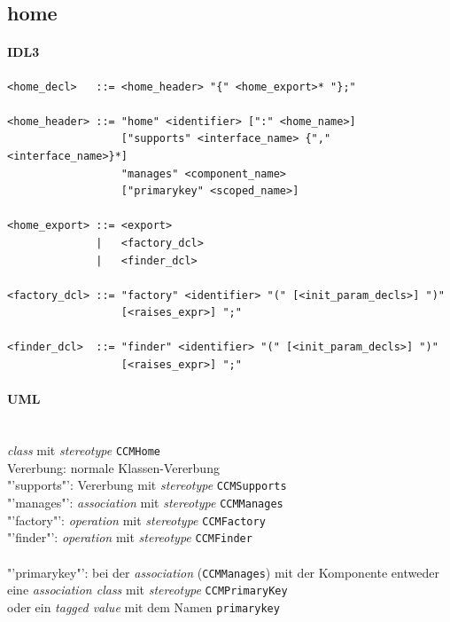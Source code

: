 \documentclass [a4paper,10pt] {scrartcl}
\begin{document}
\cleardoublepage
\subsection{home}
\paragraph{IDL3}
\begin{verbatim}
<home_decl>   ::= <home_header> "{" <home_export>* "};"

<home_header> ::= "home" <identifier> [":" <home_name>]
                  ["supports" <interface_name> {"," <interface_name>}*]
                  "manages" <component_name>
                  ["primarykey" <scoped_name>]

<home_export> ::= <export>
              |   <factory_dcl>
              |   <finder_dcl>

<factory_dcl> ::= "factory" <identifier> "(" [<init_param_decls>] ")"
                  [<raises_expr>] ";"

<finder_dcl>  ::= "finder" <identifier> "(" [<init_param_decls>] ")"
                  [<raises_expr>] ";"
\end{verbatim}
\paragraph{UML}~\\
\emph{class} mit \emph{stereotype} \texttt{CCMHome}\\
Vererbung: normale Klassen-Vererbung\\
"'supports"': Vererbung mit \emph{stereotype} \texttt{CCMSupports}\\
"'manages"': \emph{association} mit \emph{stereotype} \texttt{CCMManages}\\
"'factory"': \emph{operation} mit \emph{stereotype} \texttt{CCMFactory}\\
"'finder"': \emph{operation} mit \emph{stereotype} \texttt{CCMFinder}\\
~\\
"'primarykey"': bei der \emph{association} (\texttt{CCMManages}) mit der Komponente entweder\\
eine \emph{association class}  mit \emph{stereotype} \texttt{CCMPrimaryKey}\\
oder ein \emph{tagged value} mit dem Namen \texttt{primarykey}\\
\end{document}
